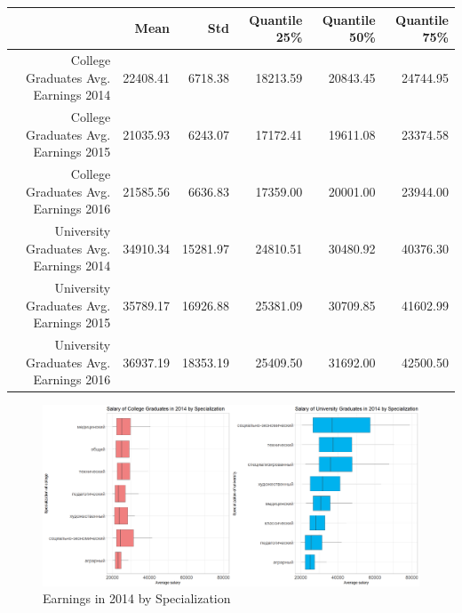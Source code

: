 \documentclass[alpha-refs]{wiley-article-05g}
\begin{document}
\begin{table}[ht]
	\centering
	\begin{tabular}{rrrrrr}
		\hline
		& Mean & Std & Quantile 25\% & Quantile 50\% & Quantile 75\% \\ 
		\hline
		College Graduates Avg. Earnings 2014 & 22408.41 & 6718.38 & 18213.59 & 20843.45 & 24744.95 \\ 
		College Graduates Avg. Earnings 2015 & 21035.93 & 6243.07 & 17172.41 & 19611.08 & 23374.58 \\ 
		College Graduates Avg. Earnings 2016 & 21585.56 & 6636.83 & 17359.00 & 20001.00 & 23944.00 \\ 
		University Graduates Avg. Earnings 2014 & 34910.34 & 15281.97 & 24810.51 & 30480.92 & 40376.30 \\ 
		University Graduates Avg. Earnings 2015 & 35789.17 & 16926.88 & 25381.09 & 30709.85 & 41602.99 \\ 
		University Graduates Avg. Earnings 2016 & 36937.19 & 18353.19 & 25409.50 & 31692.00 & 42500.50 \\ 
		\hline
	\end{tabular}
\end{table}


\begin{figure}[H]
	\centering
	\includegraphics[width=400pt]{box_plot1a.png}
	\caption{Earnings in 2014 by Specialization}\label{fig:1.1}
\end{figure}
\end{document}
